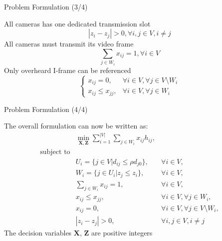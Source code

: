 \begin{frame}{Problem Formulation (3/4)}
\begin{itemize}
	\myItem All cameras has one dedicated transmission slot
	\begin{equation}
		|z_i - z_j| > 0, \forall i,j \in V, i \neq j
		\label{eq::oneSlotOneCam}
	\end{equation}
	\myItem All cameras must transmit its video frame
	\begin{equation}
		\sum_{j \in W_i} x_{ij} = 1, \forall i \in V
		\label{eq::referenceConstraint}
	\end{equation}
	\myItem Only overheard I-frame can be referenced
	\begin{equation} \left\{ \begin{array}{ll}
		x_{ij} = 0, &\forall i \in V, \forall j \in V \setminus W_i \\
		x_{ij} \leq x_{jj}, &\forall i \in V, \forall j \in W_i \end{array} \right.
		\label{eq::referenceOnlyIframe}
	\end{equation}
\end{itemize}
\end{frame}
\begin{frame}{Problem Formulation (4/4)}
\begin{itemize}
	\myItem The overall formulation can now be written as:
	{\small	\begin{align}
		&\underset{\mathbf{X},\mathbf{Z}}{\min} \sum_{i=1}^{|V|} \sum_{j \in W_i}  x_{ij} h_{ij}, & \nonumber \\
\text{subject to} & & \nonumber \\
		&U_i = \{ j \in V | d_{ij} \leq \rho d_{j0} \}, &\forall i \in V, \nonumber \\
		&W_i = \{ j \in U_i | z_j \leq z_i \}, &\forall i \in V, \nonumber \\
		&\sum_{j \in W_i} x_{ij} = 1, &\forall i \in V, \nonumber \\
		&x_{ij} \leq x_{jj}, &\forall i \in V, \forall j \in W_i, \nonumber \\
		&x_{ij} = 0, &\forall i \in V, \forall j \in V \setminus W_i, \nonumber \\
		&|z_i - z_j| > 0, &\forall i,j \in V, i \neq j
\label{eq::formulation}
	\end{align} } %
	\myItem The decision variables $\mathbf{X}$, $\mathbf{Z}$ are positive integers
\end{itemize}
\end{frame}